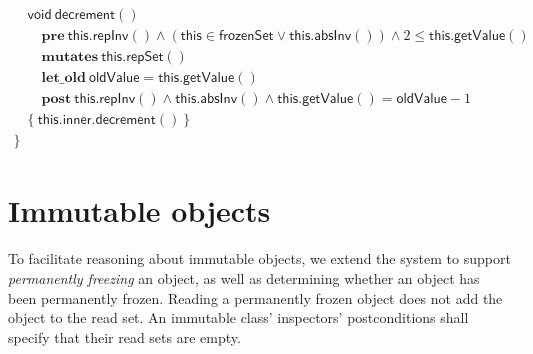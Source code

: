 \documentclass{article}
\begin{document}
$$\begin{array}{l}
\quad \mathsf{void}\ \mathsf{decrement}()\\
\quad\quad \mathbf{pre}\ \mathsf{this}.\mathsf{repInv}() \land (\mathsf{this} \in \mathsf{frozenSet} \lor \mathsf{this}.\mathsf{absInv}()) \land 2 \le \mathsf{this}.\mathsf{getValue}()\\
\quad\quad \mathbf{mutates}\ \mathsf{this}.\mathsf{repSet}()\\
\quad\quad \mathbf{let\_old}\ \mathsf{oldValue} = \mathsf{this}.\mathsf{getValue}()\\
\quad\quad \mathbf{post}\ \mathsf{this}.\mathsf{repInv}() \land \mathsf{this}.\mathsf{absInv}() \land \mathsf{this}.\mathsf{getValue}() = \mathsf{oldValue} - 1\\
\quad \{\ \mathsf{this}.\mathsf{inner}.\mathsf{decrement}()\ \}\\
\}
\end{array}$$

\section{Immutable objects}

To facilitate reasoning about immutable objects, we extend the system to support \emph{permanently freezing} an object, as well as determining whether an object has been permanently frozen. Reading a permanently frozen object does not add the object to the read set. An immutable class' inspectors' postconditions shall specify that their read sets are empty.
\end{document}
